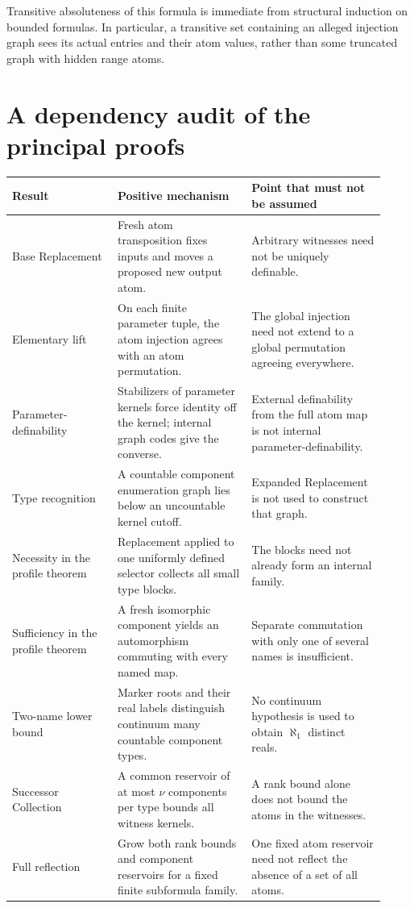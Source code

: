 \documentclass[11pt,letterpaper]{article}
\numberwithin{equation}{section}
\theoremstyle{plain}
\theoremstyle{definition}
\theoremstyle{remark}
\begin{document}
Transitive absoluteness of this formula is immediate from structural induction on bounded formulas. In particular, a transitive set containing an alleged injection graph sees its actual entries and their atom values, rather than some truncated graph with hidden range atoms.

\section{A dependency audit of the principal proofs}\label{nee:app:audit}

\begin{longtable}{@{}L{0.26\linewidth}L{0.33\linewidth}L{0.33\linewidth}@{}}
\toprule
Result & Positive mechanism & Point that must not be assumed\\
\midrule
\endhead
Base Replacement & Fresh atom transposition fixes inputs and moves a proposed new output atom. & Arbitrary witnesses need not be uniquely definable.\\[5pt]
Elementary lift & On each finite parameter tuple, the atom injection agrees with an atom permutation. & The global injection need not extend to a global permutation agreeing everywhere.\\[5pt]
Parameter-definability & Stabilizers of parameter kernels force identity off the kernel; internal graph codes give the converse. & External definability from the full atom map is not internal parameter-definability.\\[5pt]
Type recognition & A countable component enumeration graph lies below an uncountable kernel cutoff. & Expanded Replacement is not used to construct that graph.\\[5pt]
Necessity in the profile theorem & Replacement applied to one uniformly defined selector collects all small type blocks. & The blocks need not already form an internal family.\\[5pt]
Sufficiency in the profile theorem & A fresh isomorphic component yields an automorphism commuting with every named map. & Separate commutation with only one of several names is insufficient.\\[5pt]
Two-name lower bound & Marker roots and their real labels distinguish continuum many countable component types. & No continuum hypothesis is used to obtain $\aleph_1$ distinct reals.\\[5pt]
Successor Collection & A common reservoir of at most $\nu$ components per type bounds all witness kernels. & A rank bound alone does not bound the atoms in the witnesses.\\[5pt]
Full reflection & Grow both rank bounds and component reservoirs for a fixed finite subformula family. & One fixed atom reservoir need not reflect the absence of a set of all atoms.\\
\bottomrule
\end{longtable}
\end{document}
